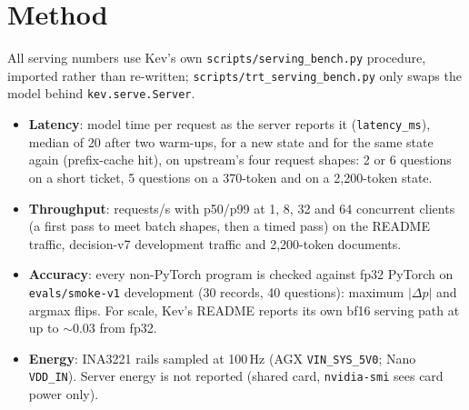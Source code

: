 \documentclass[10pt]{article}
\begin{document}
\section{Method}
All serving numbers use Kev's own \texttt{scripts/serving\_bench.py} procedure, imported rather than re-written; \texttt{scripts/trt\_serving\_bench.py} only swaps the model behind \texttt{kev.serve.Server}.
\begin{itemize}
\item \textbf{Latency}: model time per request as the server reports it (\texttt{latency\_ms}), median of 20 after two warm-ups, for a new state and for the same state again (prefix-cache hit), on upstream's four request shapes: 2 or 6 questions on a short ticket, 5 questions on a 370-token and on a 2{,}200-token state.
\item \textbf{Throughput}: requests/s with p50/p99 at 1, 8, 32 and 64 concurrent clients (a first pass to meet batch shapes, then a timed pass) on the README traffic, decision-v7 development traffic and 2{,}200-token documents.
\item \textbf{Accuracy}: every non-PyTorch program is checked against fp32 PyTorch on \texttt{evals/smoke-v1} development (30 records, 40 questions): maximum $|\Delta p|$ and argmax flips. For scale, Kev's README reports its own bf16 serving path at up to $\sim$0.03 from fp32.
\item \textbf{Energy}: INA3221 rails sampled at 100\,Hz (AGX \texttt{VIN\_SYS\_5V0}; Nano \texttt{VDD\_IN}). Server energy is not reported (shared card, \texttt{nvidia-smi} sees card power only).
\end{itemize}
\end{document}
